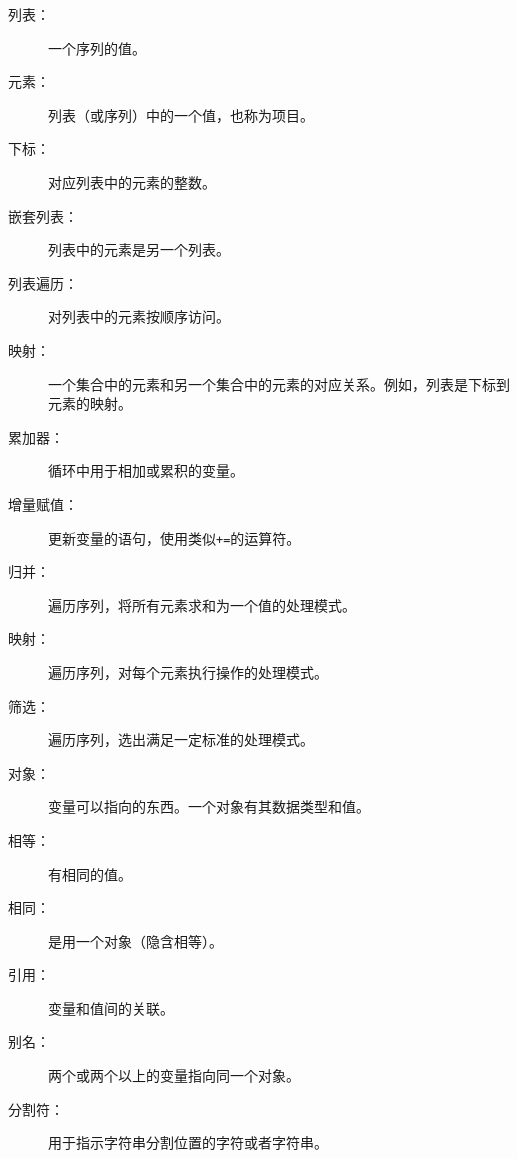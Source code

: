 \begin{description}

\item[列表：] 一个序列的值。

\item[元素：] 列表（或序列）中的一个值，也称为项目。

\item[下标：] 对应列表中的元素的整数。

\item[嵌套列表：] 列表中的元素是另一个列表。

\item[列表遍历：] 对列表中的元素按顺序访问。

\item[映射：] 一个集合中的元素和另一个集合中的元素的对应关系。例如，列表是下标到元素的映射。

\item[累加器：] 循环中用于相加或累积的变量。

\item[增量赋值：] 更新变量的语句，使用类似\verb"+="的运算符。


\item[归并：] 遍历序列，将所有元素求和为一个值的处理模式。

\item[映射：] 遍历序列，对每个元素执行操作的处理模式。

\item[筛选：] 遍历序列，选出满足一定标准的处理模式。

\item[对象：] 变量可以指向的东西。一个对象有其数据类型和值。

\item[相等：] 有相同的值。

\item[相同：] 是用一个对象（隐含相等）。

\item[引用：] 变量和值间的关联。

\item[别名：] 两个或两个以上的变量指向同一个对象。

\item[分割符：] 用于指示字符串分割位置的字符或者字符串。

\end{description}


